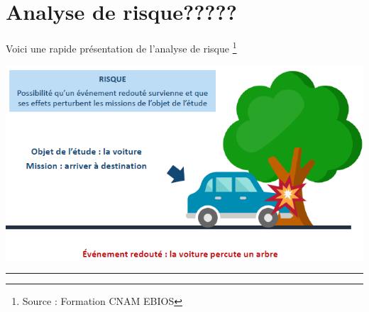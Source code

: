 \documentclass[french, 12pt]{article}%
\begin{document}
\vspace{0.25cm}



\section{Analyse de risque?????}
Voici une rapide présentation de l'analyse de risque \footnote{Source : Formation CNAM EBIOS }

\begin{center}
\includegraphics[scale=0.7]{./ressource/voiture1}
\end{center}

\begin{center}
 \rule{1.0\linewidth}{1pt}
 \end{center}
\end{document}
